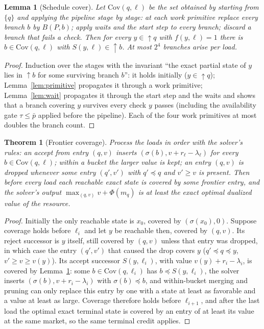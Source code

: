 \documentclass[11pt]{article}
\newtheorem{theorem}{Theorem}
\newtheorem{lemma}{Lemma}
\begin{document}
\begin{lemma}[Schedule cover]
\label{lem:cover}
Let $\mathrm{Cov}(q, \ell)$ be the set obtained by starting from
$\{q\}$ and applying the pipeline stage by stage: at each work
primitive replace every branch $b$ by $B(P, b)$; apply waits and the
start step to every branch; discard a branch that fails a check. Then
for every $y \in \uparrow\! q$ with $f(y, \ell) = 1$ there is
$b \in \mathrm{Cov}(q, \ell)$ with $S(y, \ell) \in \uparrow\! b$. At most
$2^4$ branches arise per load.
\end{lemma}

\begin{proof}
Induction over the stages with the invariant ``the exact partial state
of $y$ lies in $\uparrow\! b$ for some surviving branch $b$'': it holds
initially ($y \in \uparrow\! q$); Lemma~\ref{lem:primitive} propagates it
through a work primitive; Lemma~\ref{lem:wait} propagates it through
the start step and the waits and shows that a branch covering $y$
survives every check $y$ passes (including the availability gate
$\tau \leq \bar{p}$ applied before the pipeline). Each of the four
work primitives at most doubles the branch count.
\end{proof}

\begin{theorem}[Frontier coverage]
\label{thm:frontier}
Process the loads in order with the solver's rules: an accept from
entry $(q, v)$ inserts $(\sigma(b), v + r_\ell - \lambda_\ell)$ for
every $b \in \mathrm{Cov}(q, \ell)$; within a bucket the larger value
is kept; an entry $(q, v)$ is dropped whenever some entry $(q', v')$
with $q' \preceq q$ and $v' \geq v$ is present. Then before every load
each reachable exact state is covered by some frontier entry, and the
solver's output $\max_{(q,v)} v + \Phi(m_q)$ is at least the exact
optimal dualized value of the resource.
\end{theorem}

\begin{proof}
Initially the only reachable state is $x_0$, covered by
$(\sigma(x_0), 0)$. Suppose coverage holds before $\ell_i$ and let $y$
be reachable then, covered by $(q, v)$. Its reject successor is $y$
itself, still covered by $(q, v)$ unless that entry was dropped, in
which case the entry $(q', v')$ that caused the drop covers $y$
($q' \preceq q \preceq y$, $v' \geq v \geq v(y)$). Its accept successor
$S(y, \ell_i)$, with value $v(y) + r_i - \lambda_i$, is covered by
Lemma~\ref{lem:cover}: some $b \in \mathrm{Cov}(q, \ell_i)$ has
$b \preceq S(y, \ell_i)$, the solver inserts $(\sigma(b), v + r_i - \lambda_i)$
with $\sigma(b) \preceq b$, and within-bucket merging and pruning can
only replace this entry by one with a state at least as favorable and
a value at least as large. Coverage therefore holds before $\ell_{i+1}$,
and after the last load the optimal exact terminal state is covered by
an entry of at least its value at the same market, so the same
terminal credit applies.
\end{proof}
\end{document}
